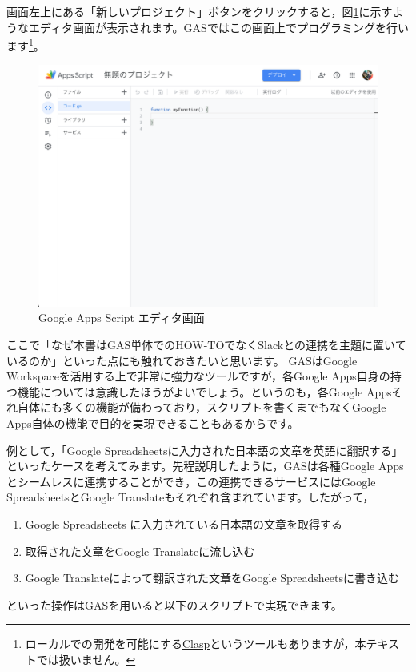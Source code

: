 \documentclass[uplatex,a4j]{jsarticle}
\begin{document}
画面左上にある「新しいプロジェクト」ボタンをクリックすると，図\ref{fig:gas_edit}に示すようなエディタ画面が表示されます。GASではこの画面上でプログラミングを行います\footnote{ローカルでの開発を可能にする\href{https://github.com/google/clasp}{Clasp}というツールもありますが，本テキストでは扱いません。}。

\begin{figure}[H]
 \centering
 \includegraphics[keepaspectratio, scale=0.4]{images/gas_edit.png}
 \caption{Google Apps Script エディタ画面}
 \label{fig:gas_edit}
\end{figure}


ここで「なぜ本書はGAS単体でのHOW-TOでなくSlackとの連携を主題に置いているのか」といった点にも触れておきたいと思います。
GASはGoogle Workspaceを活用する上で非常に強力なツールですが，各Google Apps自身の持つ機能については意識したほうがよいでしょう。というのも，各Google Appsそれ自体にも多くの機能が備わっており，スクリプトを書くまでもなくGoogle Apps自体の機能で目的を実現できることもあるからです。

例として，「Google Spreadsheetsに入力された日本語の文章を英語に翻訳する」といったケースを考えてみます。先程説明したように，GASは各種Google Appsとシームレスに連携することができ，この連携できるサービスにはGoogle SpreadsheetsとGoogle Translateもそれぞれ含まれています。したがって，
\begin{enumerate}
\item Google Spreadsheets に入力されている日本語の文章を取得する
\item 取得された文章をGoogle Translateに流し込む
\item Google Translateによって翻訳された文章をGoogle Spreadsheetsに書き込む
\end{enumerate}
といった操作はGASを用いると以下のスクリプトで実現できます。
\end{document}
